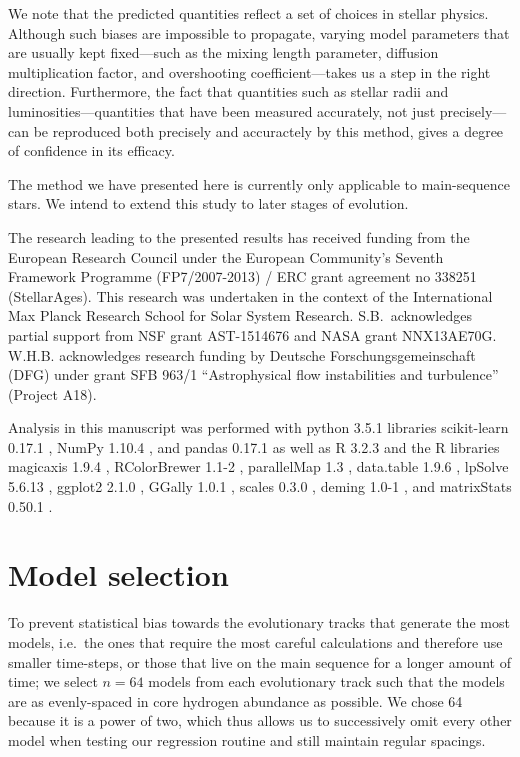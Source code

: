 \documentclass[manuscript,linenumbers]{aastex6}
\newif\ifref
\newcommand{\mb}[1]{\ifref\boldmath\textbf{#1}\unboldmath\else #1\fi}
\begin{document}
We note that the predicted quantities reflect a set of choices in stellar physics. Although such biases are impossible to propagate, varying model parameters that are usually kept fixed---such as the mixing length parameter, diffusion \mb{multiplication} factor, and overshooting coefficient---takes us a step in the right direction. Furthermore, the fact that quantities such as stellar radii and luminosities---quantities that have been measured accurately, not just precisely---can be reproduced both precisely and accuractely by this method, gives a degree of confidence in its efficacy. 

The method we have presented here is currently only applicable to main-sequence stars. We intend to extend this study to later stages of evolution. 


\acknowledgments The research leading to the presented results has received funding from the European Research Council under the European Community's Seventh Framework Programme (FP7/2007-2013) / ERC grant agreement no 338251 (StellarAges). This research was undertaken in the context of the International Max Planck Research School \mb{for Solar System Research}. S.B.\ acknowledges partial support from NSF grant AST-1514676 and NASA grant NNX13AE70G. W.H.B. acknowledges research funding by Deutsche Forschungsgemeinschaft (DFG) under grant SFB 963/1 ``Astrophysical flow instabilities and turbulence'' (Project A18).

\software Analysis in this manuscript was performed with \mb{python 3.5.1} libraries scikit-learn \mb{0.17.1} \citep{scikit-learn}, NumPy \mb{1.10.4} \citep{van2011numpy}, and pandas \mb{0.17.1} \citep{mckinney2010data} as well as \mb{R 3.2.3} \citep{R} and the R libraries magicaxis \mb{1.9.4} \citep{magicaxis}, RColorBrewer \mb{1.1-2} \citep{RColorBrewer}, parallelMap \mb{1.3} \citep{parallelMap}, data.table \mb{1.9.6} \citep{data.table}, lpSolve \mb{5.6.13} \citep{lpSolve}, ggplot2 \mb{2.1.0} \citep{ggplot2}, GGally \mb{1.0.1} \citep{GGally}, scales \mb{0.3.0} \citep{scales}, deming \mb{1.0-1} \citep{deming}, and matrixStats \mb{0.50.1} \citep{matrixStats}.

\appendix

\section{Model selection}
\label{sec:selection}
To prevent statistical bias towards the evolutionary tracks that generate the most models, i.e.\ the ones that require the most careful calculations and therefore use smaller time-steps, or those that live on the main sequence for a longer amount of time; we select $n=64$ models from each evolutionary track such that the models are as evenly-spaced in core hydrogen abundance as possible. \mb{We chose 64 because it is a power of two, which thus allows us to successively omit every other model when testing our regression routine and still maintain regular spacings.}
\end{document}
